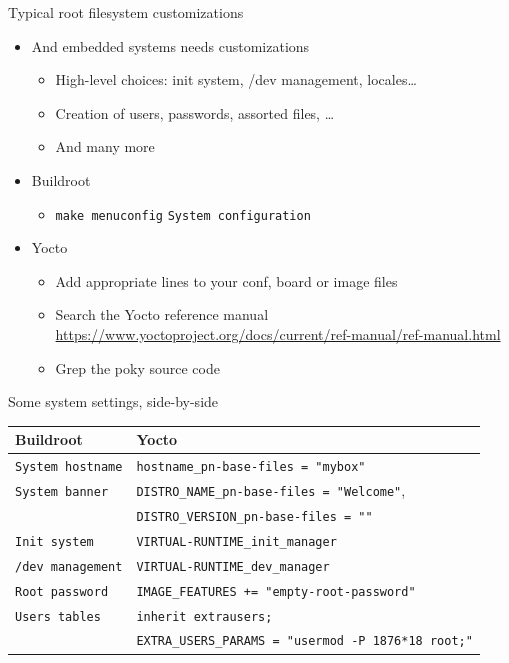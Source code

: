 \documentclass[xetex,table,aspectratio=169]{beamer}
\newcommand{\bg}[1]{
  \usebackgroundtemplate{
    \texttt{[image: images/bg-\#1.png]}
  }
}
\begin{document}
\bg{both}
\begin{frame}{Typical root filesystem customizations}
  \begin{itemize}
  \item And embedded systems needs customizations
    \begin{itemize}
    \item High-level choices: init system, /dev management, locales\dots
    \item Creation of users, passwords, assorted files, \dots
    \item And many more
    \end{itemize}
  \item Buildroot
    \begin{itemize}
    \item {\tt make menuconfig} \textrightarrow{} {\tt System
      configuration}
    \end{itemize}
  \item Yocto
    \begin{itemize}
    \item Add appropriate lines to your conf, board or image files
    \item Search the Yocto reference manual
      \url{https://www.yoctoproject.org/docs/current/ref-manual/ref-manual.html}
    \item Grep the poky source code
    \end{itemize}
  \end{itemize}
\end{frame}

\begin{frame}{Some system settings, side-by-side}
  \begin{table}
    \begin{tabular}{ll}
      \toprule
      Buildroot & Yocto\\
      \midrule
      {\tt System hostname} & {\tt hostname\_pn-base-files = "mybox"}\\
      {\tt System banner}   & {\tt DISTRO\_NAME\_pn-base-files = "Welcome"},\\
                            & {\tt DISTRO\_VERSION\_pn-base-files = ""}\\
      \midrule
      {\tt Init system}     & {\tt VIRTUAL-RUNTIME\_init\_manager}\\
      {\tt /dev management} & {\tt VIRTUAL-RUNTIME\_dev\_manager}\\
      \midrule
      {\tt Root password} & {\tt IMAGE\_FEATURES += "empty-root-password"}\\
      {\tt Users tables} & {\tt inherit extrausers;}\\
                         & {\tt EXTRA\_USERS\_PARAMS = "usermod -P 1876*18 root;"}\\
      \bottomrule
    \end{tabular}
  \end{table}
\end{frame}
\end{document}

